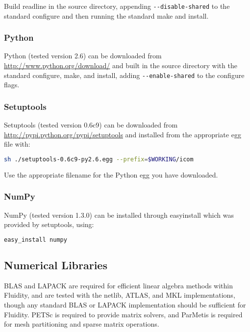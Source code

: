 Build readline in the source directory, appending
\lstinline[language=bash]+--disable-shared+ to the standard configure and then
running the standard make and install.

\subsubsection{Python}
\label{sec:required_libraries_python_python}

Python (tested version 2.6) can be downloaded from
\url{http://www.python.org/download/} and built in the source directory with
the standard configure, make, and install, adding
\lstinline[language=bash]+--enable-shared+ to the configure flags.

\subsubsection{Setuptools}
\label{sec:required_libraries_python_setuptools}

Setuptools (tested version 0.6c9) can be downloaded from
\url{http://pypi.python.org/pypi/setuptools} and installed from the appropriate
egg file with:

\begin{lstlisting}[language=bash]
sh ./setuptools-0.6c9-py2.6.egg --prefix=$WORKING/icom
\end{lstlisting}

Use the appropriate filename for the Python egg you have downloaded.

\subsubsection{NumPy}
\label{sec:required_libraries_python_numpy}

NumPy (tested version 1.3.0) can be installed through
easy{\textunderscore}install which was provided by setuptools, using:

\begin{lstlisting}[language=bash]
easy_install numpy
\end{lstlisting}

\subsection{Numerical Libraries}
\label{sec:required_libraries_numerical}

BLAS and LAPACK are required for efficient linear algebra methods within
Fluidity, and are tested with the netlib, ATLAS, and MKL implementations, though
any standard BLAS or LAPACK implementation should be sufficient for Fluidity.
PETSc is required to provide matrix solvers, and ParMetis is required for mesh
partitioning and sparse matrix operations.

